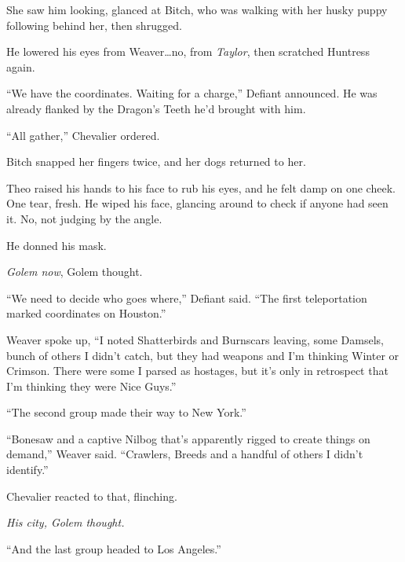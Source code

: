 She saw him looking, glanced at Bitch, who was walking with her husky puppy following behind her, then shrugged.



He lowered his eyes from Weaver\ldots no, from \emph{Taylor}, then scratched Huntress again.



``We have the coordinates.  Waiting for a charge,'' Defiant announced.  He was already flanked by the Dragon's Teeth he'd brought with him.



``All gather,'' Chevalier ordered.



Bitch snapped her fingers twice, and her dogs returned to her.



Theo raised his hands to his face to rub his eyes, and he felt damp on one cheek.  One tear, fresh.  He wiped his face, glancing around to check if anyone had seen it.  No, not judging by the angle.



He donned his mask.



\emph{Golem now}, Golem thought.



``We need to decide who goes where,'' Defiant said.  ``The first teleportation marked coordinates on Houston.''



Weaver spoke up, ``I noted Shatterbirds and Burnscars leaving, some Damsels, bunch of others I didn't catch, but they had weapons and I'm thinking Winter or Crimson.  There were some I parsed as hostages, but it's only in retrospect that I'm thinking they were Nice Guys.''



``The second group made their way to New York.''



``Bonesaw and a captive Nilbog that's apparently rigged to create things on demand,'' Weaver said.  ``Crawlers, Breeds and a handful of others I didn't identify.''



Chevalier reacted to that, flinching.



\emph{His city, Golem thought.}



``And the last group headed to Los Angeles.''



